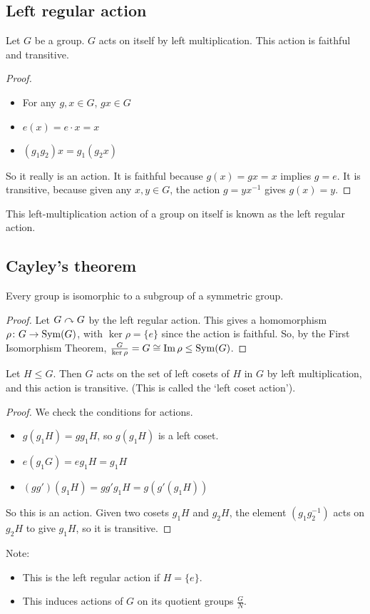 \subsection{Left regular action}
\begin{lemma}
	Let \(G\) be a group.
	\(G\) acts on itself by left multiplication.
	This action is faithful and transitive.
\end{lemma}
\begin{proof}
	\begin{itemize}
		\item For any \(g, x \in G\), \(gx \in G\)
		\item \(e(x) = e \cdot x = x\)
		\item \((g_1 g_2) x = g_1 (g_2 x)\)
	\end{itemize}
	So it really is an action.
	It is faithful because \(g(x) = gx = x\) implies \(g = e\).
	It is transitive, because given any \(x, y \in G\), the action \(g = yx^{-1}\) gives \(g(x) = y\).
\end{proof}
\begin{definition}
	This left-multiplication action of a group on itself is known as the left regular action.
\end{definition}

\subsection{Cayley's theorem}
\begin{theorem}
	Every group is isomorphic to a subgroup of a symmetric group.
\end{theorem}
\begin{proof}
	Let \(G \curvearrowright G\) by the left regular action.
	This gives a homomorphism \(\rho\colon G \to \operatorname{Sym}(G)\), with \(\ker \rho = \{ e \}\) since the action is faithful.
	So, by the First Isomorphism Theorem, \(\frac{G}{\ker \rho} = G \cong \Im \rho \leq \operatorname{Sym}(G)\).
\end{proof}

\begin{proposition}
	Let \(H \leq G\).
	Then \(G\) acts on the set of left cosets of \(H\) in \(G\) by left multiplication, and this action is transitive.
	(This is called the `left coset action').
\end{proposition}
\begin{proof}
	We check the conditions for actions.
	\begin{itemize}
		\item \(g(g_1H) = gg_1H\), so \(g(g_1H)\) is a left coset.
		\item \(e(g_1G) = eg_1H = g_1H\)
		\item \((gg')(g_1H) = gg'g_1H = g(g'(g_1H))\)
	\end{itemize}
	So this is an action.
	Given two cosets \(g_1H\) and \(g_2H\), the element \((g_1g_2^{-1})\) acts on \(g_2H\) to give \(g_1H\), so it is transitive.
\end{proof}
Note:
\begin{itemize}
	\item This is the left regular action if \(H = \{ e \}\).
	\item This induces actions of \(G\) on its quotient groups \(\frac{G}{N}\).
\end{itemize}
